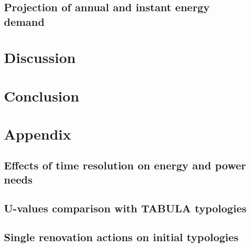 \documentclass[11pt]{article}
\begin{document}

    \subsection{Projection of annual and instant energy demand} %
    \label{sub:évoltuion_des_consommations}
    

\clearpage
\section{Discussion}
\label{sec:disc}

\clearpage
\section{Conclusion}
\label{sec:conclu}



\clearpage
\printbibliography


\appendix

\clearpage
\section{Appendix} %
\label{sec:appendix}

    \subsection{Effects of time resolution on energy and power needs} %
    \label{sub:effects_of_time_resolution_on_energy_and_power_needs}
    

    \subsection{U-values comparison with TABULA typologies} %
    \label{sub:u_values_comparison_with_tabula_typologies}
    
    
    \subsection{Single renovation actions on initial typologies} %
    \label{sub:single_renovation_actions_on_initial_typologies}
    

\end{document}
